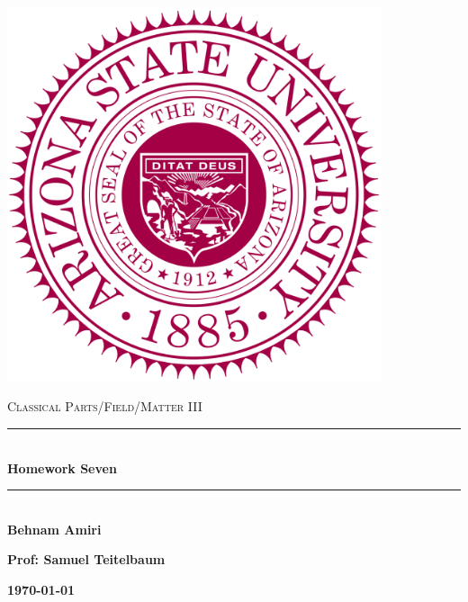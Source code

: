 \documentclass[fleqn]{article}
\begin{document}
  \begin{titlepage}

    \newcommand{\HRule}{\rule{\linewidth}{0.5mm}}

    \center

    \begin{center}
      \includegraphics[height=11cm, width=11cm]{asu.png}
    \end{center}

    \vline

    \textsc{\LARGE Classical Parts/Field/Matter III}\\[1.5cm]

    \HRule \\[0.5cm]
    { \huge \bfseries Homework Seven}\\[0.4cm] 
    \HRule \\[1.0cm]

    \textbf{Behnam Amiri}

    \bigbreak

    \textbf{Prof: Samuel Teitelbaum}

    \bigbreak

    \textbf{{\large \today}\\[2cm]}

    \vfill

  \end{titlepage}
\end{document}
